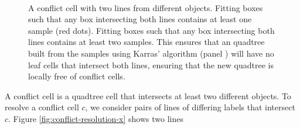 \documentclass[submission]{gmp2017}
\begin{document}
\begin{figure}
  \centering
   \\
  \caption{
    \protect{} A conflict cell with two lines from different objects.
    \protect{} Fitting boxes such that any box intersecting both lines contains at least one sample (red dots).
    \protect{} Fitting boxes such that any box intersecting both lines contains at least two samples. This ensures that an quadtree built from the samples using Karras' algorithm (panel \protect{}) will have no leaf cells that intersect both lines, ensuring that the new quadtree is locally free of conflict cells.
  }
  \label{fig:conflict-resolution}
\end{figure}



A conflict cell is a quadtree cell that intersects at least two different objects. To resolve a conflict cell $c$, we consider pairs of lines of differing labels that intersect $c$. Figure \ref{fig:conflict-resolution-x} shows two lines
\end{document}
